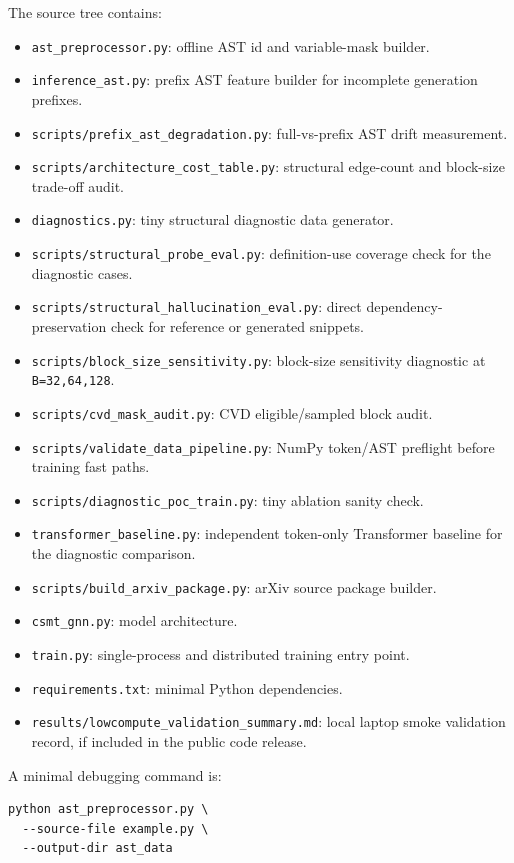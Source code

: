 \documentclass[10pt]{article}
\begin{document}
The source tree contains:
\begin{itemize}
  \item \texttt{ast\_preprocessor.py}: offline AST id and variable-mask builder.
  \item \texttt{inference\_ast.py}: prefix AST feature builder for incomplete generation prefixes.
  \item \texttt{scripts/prefix\_ast\_degradation.py}: full-vs-prefix AST drift measurement.
  \item \texttt{scripts/architecture\_cost\_table.py}: structural edge-count and block-size trade-off audit.
  \item \texttt{diagnostics.py}: tiny structural diagnostic data generator.
  \item \texttt{scripts/structural\_probe\_eval.py}: definition-use coverage check for the diagnostic cases.
  \item \texttt{scripts/structural\_hallucination\_eval.py}: direct dependency-preservation check for reference or generated snippets.
  \item \texttt{scripts/block\_size\_sensitivity.py}: block-size sensitivity diagnostic at \texttt{B=32,64,128}.
  \item \texttt{scripts/cvd\_mask\_audit.py}: CVD eligible/sampled block audit.
  \item \texttt{scripts/validate\_data\_pipeline.py}: NumPy token/AST preflight before training fast paths.
  \item \texttt{scripts/diagnostic\_poc\_train.py}: tiny ablation sanity check.
  \item \texttt{transformer\_baseline.py}: independent token-only Transformer
  baseline for the diagnostic comparison.
  \item \texttt{scripts/build\_arxiv\_package.py}: arXiv source package builder.
  \item \texttt{csmt\_gnn.py}: model architecture.
  \item \texttt{train.py}: single-process and distributed training entry point.
  \item \texttt{requirements.txt}: minimal Python dependencies.
  \item \texttt{results/lowcompute\_validation\_summary.md}: local laptop smoke
  validation record, if included in the public code release.
\end{itemize}

A minimal debugging command is:
\begin{verbatim}
python ast_preprocessor.py \
  --source-file example.py \
  --output-dir ast_data
\end{verbatim}
\end{document}
